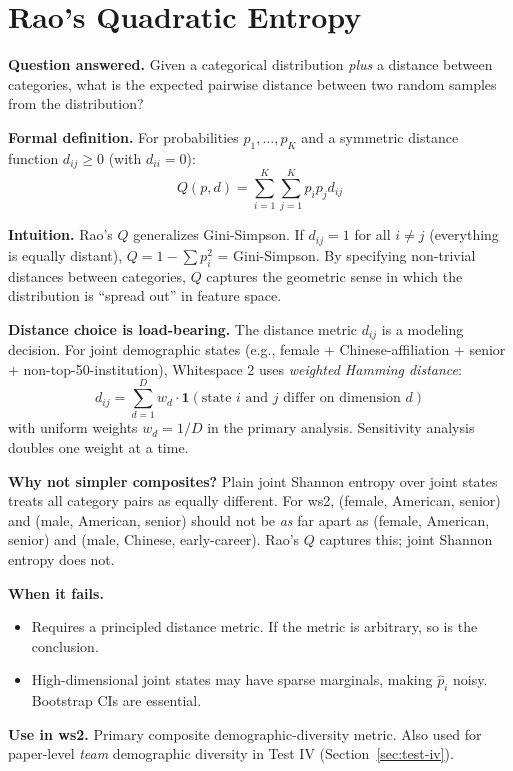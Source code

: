 \documentclass[11pt]{article}
\begin{document}
\section{Rao's Quadratic Entropy}
\label{sec:rao-q}

\textbf{Question answered.} Given a categorical distribution
\emph{plus} a distance between categories, what is the expected pairwise
distance between two random samples from the distribution?

\textbf{Formal definition.} For probabilities $p_1, \ldots, p_K$ and a
symmetric distance function $d_{ij} \ge 0$ (with $d_{ii} = 0$):
\[
  Q(p, d) = \sum_{i=1}^{K} \sum_{j=1}^{K} p_i p_j d_{ij}
\]

\textbf{Intuition.} Rao's $Q$ generalizes Gini-Simpson. If $d_{ij} = 1$
for all $i \ne j$ (everything is equally distant), $Q = 1 - \sum p_i^2$
= Gini-Simpson. By specifying non-trivial distances between categories,
$Q$ captures the geometric sense in which the distribution is
``spread out'' in feature space.

\textbf{Distance choice is load-bearing.} The distance metric $d_{ij}$
is a modeling decision. For joint demographic states (e.g., female +
Chinese-affiliation + senior + non-top-50-institution), Whitespace 2
uses \textit{weighted Hamming distance}:
\[
  d_{ij} = \sum_{d=1}^{D} w_d \cdot \mathbf{1}(\text{state } i
  \text{ and } j \text{ differ on dimension } d)
\]
with uniform weights $w_d = 1/D$ in the primary analysis. Sensitivity
analysis doubles one weight at a time.

\textbf{Why not simpler composites?} Plain joint Shannon entropy over
joint states treats all category pairs as equally different. For ws2,
(female, American, senior) and (male, American, senior) should not be
\textit{as} far apart as (female, American, senior) and (male, Chinese,
early-career). Rao's $Q$ captures this; joint Shannon entropy does not.

\textbf{When it fails.}
\begin{itemize}[nosep]
  \item Requires a principled distance metric. If the metric is
    arbitrary, so is the conclusion.
  \item High-dimensional joint states may have sparse marginals,
    making $\hat p_i$ noisy. Bootstrap CIs are essential.
\end{itemize}

\textbf{Use in ws2.} Primary composite demographic-diversity metric.
Also used for paper-level \textit{team} demographic diversity in Test IV
(Section~\ref{sec:test-iv}).
\end{document}
